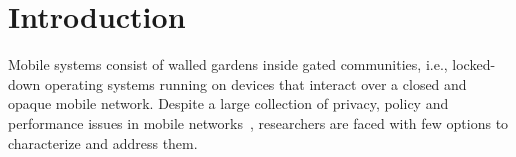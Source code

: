 \section{Introduction}
\label{sec:introduction}


Mobile systems consist of walled gardens inside gated communities, i.e., locked-down operating systems running on devices that interact over a closed and opaque mobile network. 
Despite a large collection of privacy, policy and performance issues in mobile networks~\cite{enck:taintdroid,hornyack:appfence,speedtest,ma:edoctor,pathak:eprof,bickford:mobilemalware}, researchers are faced with few options to characterize and address them.




